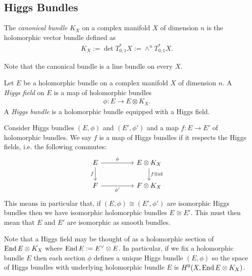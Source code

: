 \documentclass[12pt]{ociamthesis}  %
\begin{document}
\subsection{Higgs Bundles}


\begin{definition}
  The \emph{canonical bundle} $K_X$ on a complex manifold $X$
  of dimension $n$ is the holomorphic vector bundle defined as
  \begin{align*}
    K_X := \det T^*_{0,1} X := \wedge^n T^*_{0,1} X.
  \end{align*}
\end{definition}

Note that the canonical bundle is a line bundle on every $X$.

\begin{definition}
  Let $E$ be a holomorphic bundle on a complex manifold $X$
  of dimension $n$.
  A \emph{Higgs field} on $E$ is a map of holomorphic bundles
  \begin{align*}
    \phi : E \to E \otimes K_X.
  \end{align*}
  A \emph{Higgs bundle} is a holomorphic bundle equipped with
  a Higgs field.
\end{definition}

Consider Higgs bundles $(E,\phi)$ and $(E',\phi')$ and a map
$f:E\to E'$ of holomorphic bundles. We say $f$ is a map of
Higgs bundles if it respects the Higgs fields, i.e. the following
commutes:
\begin{equation*}
  \begin{tikzcd}
    E && {E\otimes K_X} \\
    F && {F\otimes K_X}
    \arrow["\phi", from=1-1, to=1-3]
    \arrow["f"', from=1-1, to=2-1]
    \arrow["{f\otimes \identity}", from=1-3, to=2-3]
    \arrow["{\phi'}"', from=2-1, to=2-3]
  \end{tikzcd}
\end{equation*}
This means in particular that, if $(E,\phi)\cong(E',\phi')$ are
isomorphic Higgs bundles then we have isomorphic holomorphic bundles
$E\cong E'$. This must then mean that $E$ and $E'$ are isomorphic
as smooth bundles.

Note that a Higgs field may be thought of as a holomorphic section
of $\operatorname{End} E \otimes K_X$ where $\operatorname{End} E := E^\vee \otimes E$.
In particular, if we fix a holomorphic bundle $E$ then each section
$\phi$ defines a unique Higgs bundle $(E,\phi)$ so the space of Higgs
bundles with underlying holomorphic bundle $E$ is
$H^0(X,\operatorname{End} E \otimes K_X)$.
\end{document}
